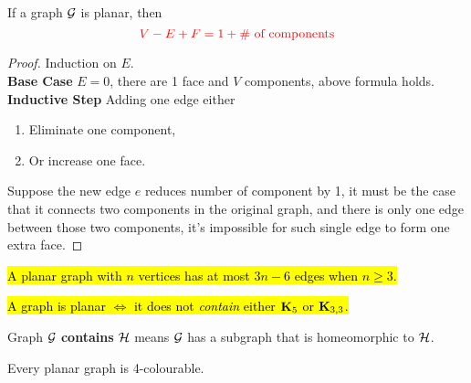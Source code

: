 \documentclass{article}
\begin{document}
			\begin{theorem}
				If a graph $\mathcal{{G}}$ is planar, then
				\begin{equation}
					\textcolor{red}{V - E + F = 1 + \text{{\# of components}}}
				\end{equation}
				\begin{proof}
					Induction on $E$.\\
					\textbf{Base Case} $E=0$, there are 1 face and $V$ components, above formula holds. \\
					\textbf{Inductive Step} Adding one edge either
					\begin{enumerate}
						\item Eliminate one component,
						\item Or increase one face.
					\end{enumerate}
					Suppose the new edge $e$ reduces number of component by 1, it must be the case that it connects two components in the original graph, and there is only one edge between those two components, it's impossible for such single edge to form one extra face.
				\end{proof}
			\end{theorem}
			
			\begin{remark}
			\end{remark}
			
			\begin{theorem}
				\hl{A planar graph with $n$ vertices has at most $3n - 6$ edges when $n \geq 3$.}
			\end{theorem}
			
			\begin{theorem}
				\hl{A graph is planar $\iff$ it does not \emph{contain} either $\textbf{K}_5$ or $\textbf{K}_{3,3}$.}
			\end{theorem}
			
			\begin{definition}
				Graph $\mathcal{{G}}$ \textbf{contains} $\mathcal{{H}}$ means $\mathcal{{G}}$ has a subgraph that is homeomorphic to $\mathcal{{H}}$.
			\end{definition}
			
			\begin{theorem}
				Every planar graph is 4-colourable.
			\end{theorem}
		
\end{document}
